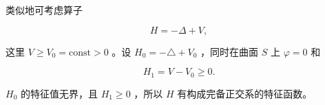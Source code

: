 类似地可考虑算子

\begin{equation*}
H = - \Delta + V,
\end{equation*}

这里 $V \geqslant V_{0} = \mathrm{const} > 0$ 。设 $H_{0} = -\triangle + V_{0}$ ，同时在曲面 $S$ 上 $\varphi = 0$ 和

\begin{equation*}
H _ {1} = V - V _ {0} \geqslant 0.
\end{equation*}

$H_{0}$ 的特征值无界，且 $H_{1} \geqslant 0$ ，所以 $H$ 有构成完备正交系的特征函数。

